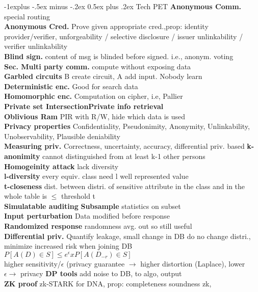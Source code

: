 \documentclass[10pt,landscape]{article}
\makeatletter
\renewcommand{\subsection}{\@startsection{subsection}{2}{0mm}%
                                {-1explus -.5ex minus -.2ex}%
                                {0.5ex plus .2ex}%
                                {\normalfont\normalsize\bfseries}}
\makeatother
\begin{document}
\begin{multicols*}{4}
\subsection{Tech PET}
\textbf{Anonymous Comm.} special routing\\
\textbf{Anonymous Cred.} Prove given appropriate cred.,prop: identity provider/verifier, unforgeability / selective disclosure / issuer unlinkability / verifier unlinkability\\
\textbf{Blind sign.} content of msg is blinded before signed. i.e., anonym. voting\\
\textbf{Sec. Multi party comm.} compute without exposing data\\
\textbf{Garbled circuits} B create circuit, A add input. Nobody learn\\
\textbf{Deterministic enc.} Good for search data\\
\textbf{Homomorphic enc.} Computation on cipher, i.e, Pallier\\
\textbf{Private set Intersection}\textbf{Private info retrieval}\\
\textbf{Oblivious Ram} PIR with R/W, hide which data is used\\
\textbf{Privacy properties} Confidentiality, Pseudonimity, Anonymity, Unlinkability, Unobservability, Plausible deniability\\
\textbf{Measuring priv.} Correctness, uncertainty, accuracy, differential priv. based
\textbf{k-anonimity} cannot distinguished from at least k-1 other persons\\
\textbf{Homogeinity attack} lack diversity\\
\textbf{l-diversity} every equiv. class need l well represented value\\
\textbf{t-closeness} dist. between distri. of sensitive attribute in the class and in the whole table is $\leq$ threshold t\\
\textbf{Simulatable auditing}
\textbf{Subsample} statistics on subset\\
\textbf{Input perturbation} Data modified before response\\
\textbf{Randomized response} randomness avg. out so still useful\\
\textbf{Differential priv.} Quantify leakage, small change in DB do no change distri., minimize increased risk when joining DB\\
$P[A(D)\in S] \leq e^\epsilon x P[A(D_{-r})\in S]$\\
higher sensitivity/$\epsilon$ (privacy guarantee $\rightarrow$ higher distortion (Laplace),
lower $\epsilon\rightarrow$ privacy
\textbf{DP tools} add noise to DB, to algo, output\\
\textbf{ZK proof} zk-STARK for DNA, prop: completeness soundness zk,


\end{multicols*}
\end{document}
